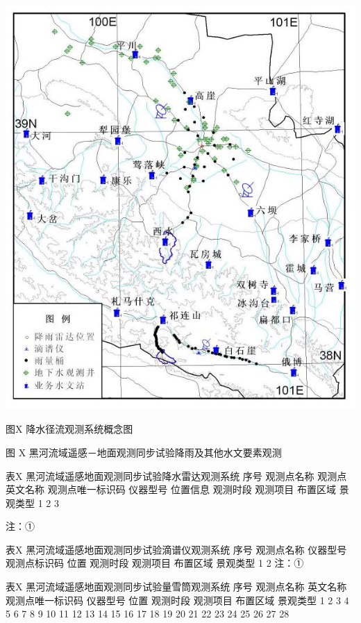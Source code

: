 \documentclass[letterpaper,10pt,english]{sphinxmanual}
\begin{document}
{\hfill\includegraphics{hydrology_system.png}\hfill}

图X 降水径流观测系统概念图

图 X  黑河流域遥感－地面观测同步试验降雨及其他水文要素观测

表X 黑河流域遥感地面观测同步试验降水雷达观测系统
序号      观测点名称   观测点英文名称 观测点唯一标识码        仪器型号    位置信息    观测时段    观测项目    布置区域    景观类型
1
2
3

注：①

表X 黑河流域遥感地面观测同步试验滴谱仪观测系统
序号      观测点名称   仪器型号    观测点标识码  位置      观测时段    观测项目    布置区域    景观类型
1
2
注：①

表X 黑河流域遥感地面观测同步试验量雪筒观测系统
序号      观测点名称   英文名称    观测点唯一标识码        仪器型号    位置      观测时段    观测项目    布置区域    景观类型
1
2
3
4
5
6
7
8
9
10
11
12
13
14
15
16
17
18
19
20
21
22
23
24
25
26
27
28
\end{document}
